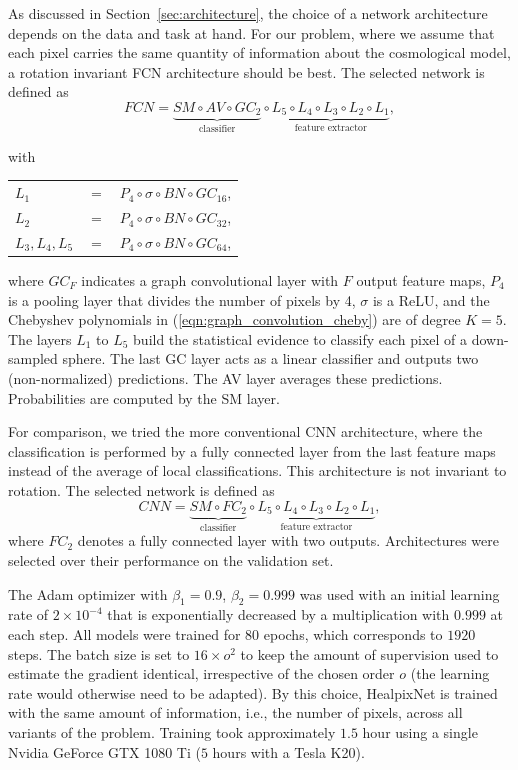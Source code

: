 \documentclass[final,twocolumn,3p,times,sort&compress]{elsarticle}
\newcommand{\secref}[1]{Section~\ref{sec:#1}}
\newcommand{\eqnref}[1]{(\ref{eqn:#1})}
\newcommand{\1}{\b{1}}              %
\newcommand{\0}{\b{0}}              %
\begin{document}
As discussed in \secref{architecture}, the choice of a network architecture depends on the data and task at hand.
For our problem, where we assume that each pixel carries the same quantity of information about the cosmological model, a rotation invariant FCN architecture should be best.
The selected network is defined as
\begin{equation*}
	FCN = \underbrace{SM \circ AV \circ GC_2}_{\text{classifier}} \circ \underbrace{L_5 \circ L_4 \circ L_3 \circ L_2 \circ L_1}_{\text{feature extractor}},
\end{equation*}
\begin{center}
with \hspace{0.5cm} \begin{tabular}{lll}
   $L_1$ &  $=$ &$ P_4 \circ \sigma \circ BN \circ GC_{16}$, \\
   $L_2$ &  $=$ &$ P_4 \circ \sigma \circ BN \circ GC_{32}$, \\
   $L_3,L_4,L_5$ & $=$ &$ P_4 \circ \sigma \circ BN \circ GC_{64}$, \\
\end{tabular}
\end{center}
where $GC_F$ indicates a graph convolutional layer with $F$ output feature maps, $P_4$ is a pooling layer that divides the number of pixels by 4, $\sigma$ is a ReLU, and the Chebyshev polynomials in \eqnref{graph_convolution_cheby} are of degree $K=5$.
The layers $L_1$ to $L_5$ build the statistical evidence to classify each pixel of a down-sampled sphere. The last GC layer acts as a linear classifier and outputs two (non-normalized) predictions. The AV layer averages these predictions. Probabilities are computed by the SM layer.

For comparison, we tried the more conventional CNN architecture, where the classification is performed by a fully connected layer from the last feature maps instead of the average of local classifications. This architecture is not invariant to rotation. The selected network is defined as
\begin{equation*}
	CNN = \underbrace{SM \circ FC_2}_{\text{classifier}} \circ \underbrace{L_5 \circ L_4 \circ L_3 \circ L_2 \circ L_1}_{\text{feature extractor}},
\end{equation*}
where $FC_2$ denotes a fully connected layer with two outputs.
Architectures were selected over their performance on the validation set.

The Adam optimizer \citep{kingma2014adam} with $\beta_1=0.9$, $\beta_2=0.999$ was used with an initial learning rate of $2 \times 10^{-4}$ that is exponentially decreased by a multiplication with $0.999$ at each step.
All models were trained for $80$ epochs, which corresponds to $1920$ steps. The batch size is set to $16 \times  o^2$ to keep the amount of supervision used to estimate the gradient identical, irrespective of the chosen order $o$ (the learning rate would otherwise need to be adapted). By this choice, HealpixNet is trained with the same amount of information, i.e., the number of pixels, across all variants of the problem.
Training took approximately $1.5$ hour using a single Nvidia GeForce GTX 1080 Ti ($5$ hours with a Tesla K20).
\end{document}
